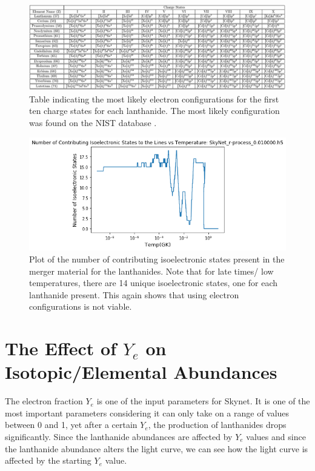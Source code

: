 \documentclass[11pt,a4paper]{article}
\begin{document}
\begin{figure}[h!]
  \includegraphics[scale = .65]{configurations.png}
  \caption{Table indicating the most likely electron configurations for the first ten charge states for each lanthanide. The most likely configuration was found on the NIST database \cite{Kramida_2020}.}
\end{figure}

\begin{figure}[h!]
  \includegraphics[scale = .75]{isoelectronic.png}
  \centering
  \caption{Plot of the number of contributing isoelectronic states present in the merger material for the lanthanides. Note that for late times/ low temperatures, there are 14 unique isoelectronic states, one for each lanthanide present. This again shows that using electron configurations is not viable. }
\end{figure}


\section{The Effect of $Y_e$ on Isotopic/Elemental Abundances}  

The electron fraction $Y_e$ is one of the input parameters for Skynet. It is one of the most important parameters considering it can only take on a range of values between 0 and 1, yet after a certain $Y_e$, the production of lanthanides drops significantly. Since the lanthanide abundances are affected by $Y_e$ values and since the lanthanide abundance alters the light curve, we can see how the light curve is affected by the starting $Y_e$ value.
\end{document}
